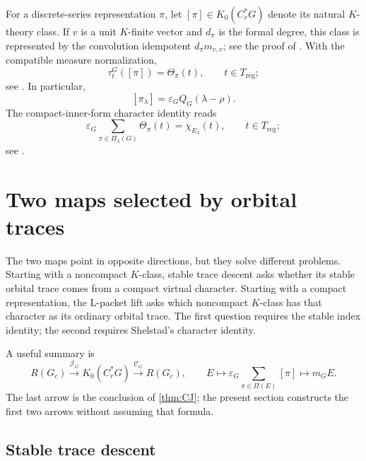 \documentclass[11pt]{amsart}
\theoremstyle{definition}
\theoremstyle{remark}
\newcommand{\Cr}{C_r^*}
\newcommand{\reg}{\mathrm{reg}}
\begin{document}
For a discrete-series representation $\pi$, let $[\pi]\in K_0(\Cr G)$ denote its natural $K$-theory class.  If $v$ is a unit $K$-finite vector and $d_\pi$ is the formal degree, this class is represented by the convolution idempotent $d_\pi m_{v,v}$; see the proof of \cite[Corollary~4.10]{HochsWang2019Orbital}.  With the compatible measure normalization,
\begin{equation}\label{eq:natural-class-character}
  \tau_t^G([\pi])=\Theta_\pi(t),
  \qquad t\in T_{\reg};
\end{equation}
see \cite[Proposition~2.11]{HochsWang2018Shelstad}.  In particular,
\begin{equation}\label{eq:natural-class-index}
  [\pi_\lambda]=\varepsilon_G Q_G(\lambda-\rho).
\end{equation}
The compact-inner-form character identity reads
\begin{equation}\label{eq:shelstad-compact}
  \varepsilon_G\sum_{\pi\in\Pi_\lambda(G)}\Theta_\pi(t)
  =\chi_{E_\lambda}(t),
  \qquad t\in T_{\reg};
\end{equation}
see \cite[Theorem~2.8]{HochsWang2018Shelstad}.

\section{Two maps selected by orbital traces}\label{sec:maps}

The two maps point in opposite directions, but they solve different problems.  Starting with a noncompact \(K\)-class, stable trace descent asks whether its stable orbital trace comes from a compact virtual character.  Starting with a compact representation, the L-packet lift asks which noncompact \(K\)-class has that character as its ordinary orbital trace.  The first question requires the stable index identity; the second requires Shelstad's character identity.

A useful summary is
\begin{equation}\label{eq:two-map-summary}
  R(G_c)
  \overset{\mathcal J_G}{\longrightarrow}
  K_0(\Cr G)
  \overset{\mathcal C_G}{\longrightarrow}
  R(G_c),
  \qquad
  E\longmapsto
  \varepsilon_G\!\sum_{\pi\in\Pi(E)}[\pi]
  \longmapsto m_GE.
\end{equation}
The last arrow is the conclusion of \cref{thm:CJ}; the present section constructs the first two arrows without assuming that formula.

\subsection{Stable trace descent}
\end{document}
